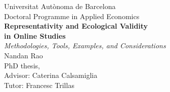 \begin{titlepage}
  \centering
  \vspace*{2cm}

  {\large Universitat Aut\`onoma de Barcelona}\\[0.4cm]
  {\large Doctoral Programme in Applied Economics}\\[3cm]

  {\Huge\bfseries Representativity and Ecological Validity \\[0.3cm] in Online Studies}\\[0.7cm]
  {\Large \emph{Methodologies, Tools, Examples, and Considerations}}\\[3cm]

  {\Large Nandan Rao}\\[0.4cm]
  {\normalsize PhD thesis, \the\year}\\[2cm]

  {\normalsize Advisor: Caterina Calsamiglia}\\
  {\normalsize Tutor: Francesc Trillas}\\

  \vfill
\end{titlepage}
\cleardoublepage
